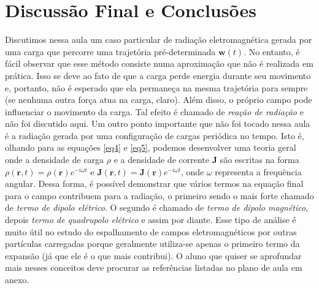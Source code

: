 \documentclass{article}
\begin{document}
\section{Discussão Final e Conclusões}

Discutimos nessa aula um caso particular de radiação eletromagnética gerada por uma carga que percorre uma trajetória pré-determinada $\mathbf{w}(t)$. No entanto, é fácil observar que esse método consiste numa aproximação que não é realizada em prática. Isso se deve ao fato de que a carga perde energia durante seu movimento e, portanto, não é esperado que ela permaneça na mesma trajetória para sempre (se nenhuma outra força atua na carga, claro). Além disso, o próprio campo pode influenciar o movimento da carga. Tal efeito é chamado de \textit{reação de radiação} e não foi discutido aqui. Um outro ponto importante que não foi tocado nessa aula é a radiação gerada por uma configuração de cargas periódica no tempo. Isto é, olhando para as equações \eqref{eq4} e \eqref{eq5}, podemos desenvolver uma teoria geral onde a densidade de carga $\rho$ e a densidade de corrente $\mathbf{J}$ são escritas na forma $\rho(\mathbf{r},t) = \rho(\mathbf{r})e^{-i\omega t}$ e $\mathbf{J}(\mathbf{r},t) = \mathbf{J}(\mathbf{r})e^{-i\omega t}$, onde $\omega$ representa a frequência angular. Dessa forma, é possível demonstrar que vários termos na equação final para o campo contribuem para a radiação, o primeiro sendo o mais forte chamado de \textit{termo de dipolo elétrico}. O segundo é chamado de \textit{termo de dipolo magnético}, depois \textit{termo de quadrupolo elétrico} e assim por diante. Esse tipo de análise é muito útil no estudo do espalhamento de campos eletromagnéticos por outras partículas carregadas porque geralmente utiliza-se apenas o primeiro termo da expansão (já que ele é o que mais contribui). O aluno que quiser se aprofundar mais nesses conceitos deve procurar as referências listadas no plano de aula em anexo.
\end{document}
